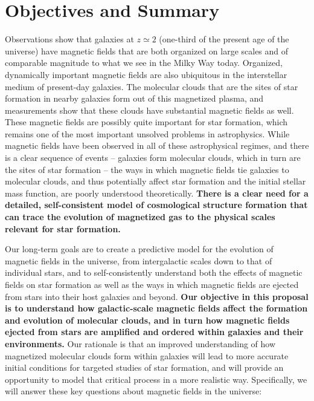 \vspace{-6mm}
\section{Objectives and Summary}
\label{sec:objectives}
\vspace{-3mm}

Observations show that galaxies at $z
\simeq 2$ (one-third of the present age of the universe) have magnetic
fields that are both organized on large scales and of comparable
magnitude to what we see in the Milky Way today.  Organized, dynamically important magnetic fields are also
ubiquitous in the interstellar medium of present-day galaxies.  The
molecular clouds that are the sites of star formation in nearby
galaxies form out of this magnetized plasma, and measurements show
that these clouds have substantial magnetic fields as well.  These
magnetic fields are possibly quite important for star formation, which
remains one of the most important unsolved problems in astrophysics.
While magnetic fields have been observed in all of these astrophysical
regimes, and there is a clear sequence of events -- galaxies form
molecular clouds, which in turn are the sites of star formation -- the
ways in which magnetic fields tie galaxies to molecular clouds, and
thus potentially affect star formation and the initial stellar mass
function, are poorly understood theoretically.  
\textbf{There is a
clear need for a detailed, self-consistent model of cosmological
structure formation that can trace the evolution of magnetized gas to
the physical scales relevant for star formation.}

Our long-term goals are to create a predictive model for the evolution
of magnetic fields in the universe, from intergalactic scales down to
that of individual stars, and to self-consistently understand both the
effects of magnetic fields on star formation as well as the ways in
which magnetic fields are ejected from stars into their host galaxies
and beyond.
\textbf{Our objective in this proposal is to understand how galactic-scale
magnetic fields affect the formation and evolution of molecular
clouds, and in turn how magnetic fields ejected from stars are
amplified and ordered within galaxies and their environments.}  Our rationale is that an improved
understanding of how magnetized molecular clouds form within galaxies
will lead to more accurate initial conditions for targeted studies of
star formation, and will provide an opportunity to model that critical
process in a more realistic way.  
Specifically, we will answer these key questions about magnetic fields
in the universe:

